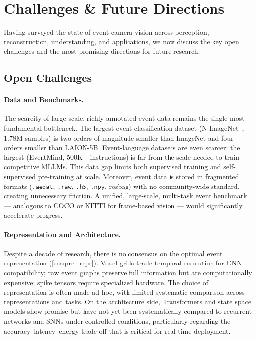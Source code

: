 \section{Challenges \& Future Directions}
\label{sec:conclusion}

Having surveyed the state of event camera vision across perception, reconstruction, understanding, and applications, we now discuss the key open challenges and the most promising directions for future research.


\subsection{Open Challenges}
\label{sec:conclusion_challenges}

\paragraph{Data and Benchmarks.}
The scarcity of large-scale, richly annotated event data remains the single most fundamental bottleneck. The largest event classification dataset (N-ImageNet~\cite{kim2021nimagenet}, 1.78M samples) is two orders of magnitude smaller than ImageNet and four orders smaller than LAION-5B. Event-language datasets are even scarcer: the largest (EventMind, 500K+ instructions) is far from the scale needed to train competitive MLLMs. This data gap limits both supervised training and self-supervised pre-training at scale. Moreover, event data is stored in fragmented formats (\texttt{.aedat}, \texttt{.raw}, \texttt{.h5}, \texttt{.npy}, rosbag) with no community-wide standard, creating unnecessary friction. A unified, large-scale, multi-task event benchmark --- analogous to COCO or KITTI for frame-based vision --- would significantly accelerate progress.

\paragraph{Representation and Architecture.}
Despite a decade of research, there is no consensus on the optimal event representation (\cref{sec:pre_repr}). Voxel grids trade temporal resolution for CNN compatibility; raw event graphs preserve full information but are computationally expensive; spike tensors require specialized hardware. The choice of representation is often made ad hoc, with limited systematic comparison across representations and tasks. On the architecture side, Transformers and state space models show promise but have not yet been systematically compared to recurrent networks and SNNs under controlled conditions, particularly regarding the accuracy--latency--energy trade-off that is critical for real-time deployment.

